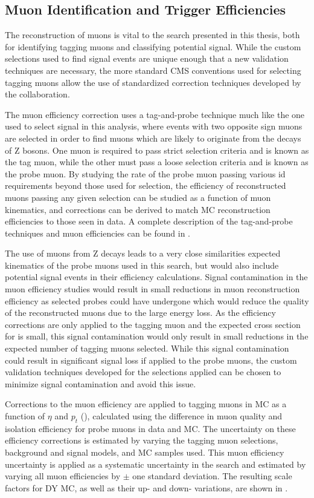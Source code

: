 \subsection{Muon Identification and Trigger Efficiencies}
The reconstruction of muons is vital to the search presented in this thesis, both for identifying tagging muons and classifying potential signal.
While the custom selections used to find signal events are unique enough that a new validation techniques are necessary, the more standard CMS conventions used for selecting tagging muons allow the use of standardized correction techniques developed by the collaboration.

The muon efficiency correction uses a tag-and-probe technique much like the one used to select signal in this analysis, where events with two opposite sign muons are selected in order to find muons which are likely to originate from the decays of Z bosons.
One muon is required to pass strict selection criteria and is known as the tag muon, while the other must pass a loose selection criteria and is known as the probe muon.
By studying the rate of the probe muon passing various id requirements beyond those used for selection, the efficiency of reconstructed muons passing any given selection can be studied as a function of muon kinematics, and corrections can be derived to match MC reconstruction efficiencies to those seen in data. 
A complete description of the tag-and-probe techniques and muon efficiencies can be found in \cite{cmsMuonPerformance}.

The use of muons from Z decays leads to a very close similarities expected kinematics of the probe muons used in this search, but would also include potential signal events in their efficiency calculations. 
Signal contamination in the muon efficiency studies would result in small reductions in muon reconstruction efficiency as selected probes could have undergone \dbrem which would reduce the quality of the reconstructed muons due to the large energy loss. 
As the efficiency corrections are only applied to the tagging muon and the expected cross section for \dbrem is small, this signal contamination would only result in small reductions in the expected number of tagging muons selected.
While this signal contamination could result in significant signal loss if applied to the probe muons, the custom validation techniques developed for the selections applied can be chosen to minimize signal contamination and avoid this issue.

Corrections to the muon efficiency are applied to tagging muons in MC as a function of $\eta$ and $p_t$ (), calculated using the difference in muon quality and isolation efficiency for probe muons in data and MC. 
The uncertainty on these efficiency corrections is estimated by varying the tagging muon selections, background and signal models, and MC samples used. 
This muon efficiency uncertainty is applied as a systematic uncertainty in the search and estimated by varying all muon efficiencies by $\pm$ one standard deviation.
The resulting scale factors for DY MC, as well as their up- and down- variations, are shown in .

